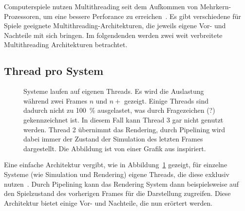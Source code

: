 Computerspiele nutzen Multithreading seit dem Aufkommen von Mehrkern-Prozessoren, um eine bessere Perforance zu erreichen~\cite{Davies2006}. Es gibt verschiedene für Spiele geeignete Multithreading-Architekturen, die jeweils eigene Vor- und Nachteile mit sich bringen. Im folgendenden werden zwei weit verbreitete Multithreading Architekturen betrachtet.

\subsection{Thread pro System}

\begin{figure}
	\centering
	\caption{Systeme laufen auf eigenen Threads. Es wird die Auslastung während zwei Frames $n$ und $n+$ gezeigt. Einige Threads sind dadurch nicht zu \SI{100}{\percent} ausgelastet, was durch Fragezeichen (?) gekennzeichnet ist. In diesem Fall kann Thread 3 gar nicht genutzt werden. Thread 2 übernimmt das Rendering, durch Pipelining wird dabei immer der Zustand der Simulation des letzten Frames dargestellt. Die Abbildung ist von einer Grafik aus \cite[S.~14]{Tatarchuk2014} inspiriert.}\label{fig:sot}
\end{figure}
Eine einfache Architektur vergibt, wie in Abbildung~\ref{fig:sot} gezeigt, für einzelne Systeme (wie Simulation und Rendering) eigene Threads, die diese exklusiv nutzen~\cite{Davies2006,Tatarchuk2014,Genova2015,Hodgman2016}. Durch Pipelining kann das Rendering System dann beispielsweise auf den Spielzustand des vorherigen Frames für die Darstellung zugreifen. Diese Architektur bietet einige Vor- und Nachteile, die nun erörtert werden.
